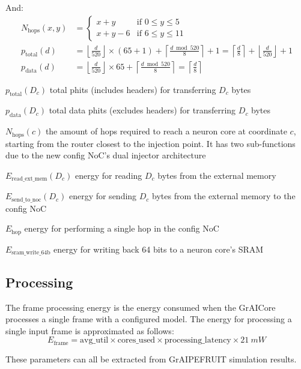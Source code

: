 And:
\begin{align*} 
N_{\textrm{hops}}(x,y) &=
    \begin{cases} 
        x + y & \textrm{if } 0 \leq y \leq 5 \\
        x + y - 6 & \text{if } 6 \leq y \leq 11
    \end{cases}
\\
p_{\textrm{total}}(d) &=
    \left\lfloor \frac{d}{520} \right\rfloor \times (65 + 1) + \left\lceil \frac{d \bmod 520}{8} \right\rceil + 1 =
    \left\lceil \frac{d}{8} \right\rceil + \left\lfloor \frac{d}{520} \right\rfloor + 1 
\\
p_{\textrm{data}}(d) &=
    \left\lfloor \frac{d}{520} \right\rfloor \times 65 + \left\lceil \frac{d \bmod 520}{8} \right\rceil =
    \left\lceil \frac{d}{8} \right\rceil
\end{align*}

\begin{eqexpl}[15mm]
    \item{$p_{\textrm{total}}(D_c)$} total phits (includes headers) for transferring $D_c$ bytes
    \item{$p_{\textrm{data}}(D_c)$} total data phits (excludes headers) for transferring $D_c$ bytes
    \item{$N_{\textrm{hops}}(c)$} the amount of hops required to reach a neuron core at coordinate $c$, starting from the router closest to the injection point. It has two sub-functions due to the new config NoC's dual injector architecture
    \item{$E_{\textrm{read\_ext\_mem}}(D_c)$} energy for reading $D_c$ bytes from the external memory
    \item{$E_{\textrm{send\_to\_noc}}(D_c)$} energy for sending $D_c$ bytes from the external memory to the config NoC
    \item{$E_{\textrm{hop}}$} energy for performing a single hop in the config NoC
    \item{$E_{\textrm{sram\_write\_64b}}$} energy for writing back 64 bits to a neuron core's SRAM
\end{eqexpl}

\subsection{Processing}
The frame processing energy is the energy consumed when the GrAICore processes a single frame with a configured model.
The energy for processing a single input frame is approximated as follows:
\begin{equation}
    E_{\textrm{frame}} = \textrm{avg\_util} \times \textrm{cores\_used} \times \textrm{processing\_latency} \times \SI{21}{mW}
\end{equation}

These parameters can all be extracted from GrAIPEFRUIT simulation results.